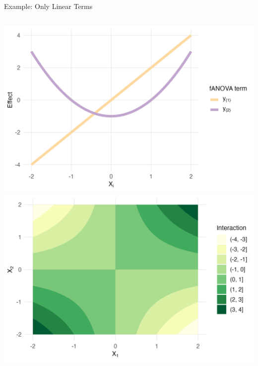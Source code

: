 \begin{frame}{Example: Only Linear Terms}
  \begin{columns}
      \includegraphics[width=\linewidth]{../images/experiment_section/classical_ex_1_a1p20_a2p00_a11p00_a22p10_a12p10_rhop00_main.png}
      \includegraphics[width=\linewidth]{../images/experiment_section/classical_ex_1_a1p20_a2p00_a11p00_a22p10_a12p10_rhop00_interaction.png}
  \end{columns}
\end{frame}






